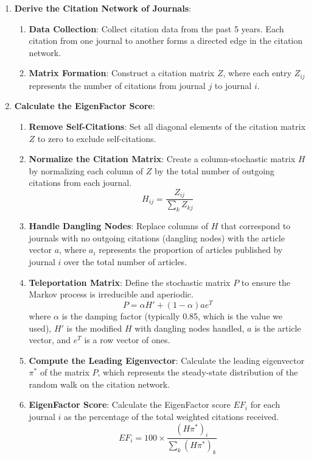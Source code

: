 \begin{enumerate}
      \item \textbf{Derive the Citation Network of Journals}:
            \begin{enumerate}
                  \item \textbf{Data Collection}: Collect citation data from the past 5 years. Each citation from one journal to another forms a directed edge in the citation network.
                  \item \textbf{Matrix Formation}: Construct a citation matrix \( Z \), where each entry \( Z_{ij} \) represents the number of citations from journal \( j \) to journal \( i \).
            \end{enumerate}

      \item \textbf{Calculate the EigenFactor Score}:
            \begin{enumerate}
                  \item \textbf{Remove Self-Citations}: Set all diagonal elements of the citation matrix \( Z \) to zero to exclude self-citations.
                  \item \textbf{Normalize the Citation Matrix}: Create a column-stochastic matrix \( H \) by normalizing each column of \( Z \) by the total number of outgoing citations from each journal.
                        \[
                              H_{ij} = \frac{Z_{ij}}{\sum_k Z_{kj}}
                        \]
                  \item \textbf{Handle Dangling Nodes}: Replace columns of \( H \) that correspond to journals with no outgoing citations (dangling nodes) with the article vector \( a \), where \( a_i \) represents the proportion of articles published by journal \( i \) over the total number of articles.
                  \item \textbf{Teleportation Matrix}: Define the stochastic matrix \( P \) to ensure the Markov process is irreducible and aperiodic.
                        \[
                              P = \alpha H' + (1 - \alpha) a e^T
                        \]
                        where \( \alpha \) is the damping factor (typically 0.85, which is the value we
                        used), \( H' \) is the modified \( H \) with dangling nodes handled, \( a \) is
                        the article vector, and \( e^T \) is a row vector of ones.
                  \item \textbf{Compute the Leading Eigenvector}: Calculate the leading eigenvector \( \pi^* \) of the matrix \( P \), which represents the steady-state distribution of the random walk on the citation network.
                  \item \textbf{EigenFactor Score}: Calculate the EigenFactor score \( EF_i \) for each journal \( i \) as the percentage of the total weighted citations received.
                        \[
                              EF_i = 100 \times \frac{(H \pi^*)_i}{\sum_k (H \pi^*)_k}
                        \]
            \end{enumerate}


\end{enumerate}
